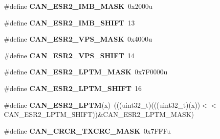 \begin{DoxyCompactItemize}
\item 
\#define {\bfseries C\+A\+N\+\_\+\+E\+S\+R2\+\_\+\+I\+M\+B\+\_\+\+M\+A\+SK}~0x2000u\hypertarget{group__CAN__Register__Masks_ga8e8d269c3e59c20582dd8d0c5ea07daf}{}\label{group__CAN__Register__Masks_ga8e8d269c3e59c20582dd8d0c5ea07daf}

\item 
\#define {\bfseries C\+A\+N\+\_\+\+E\+S\+R2\+\_\+\+I\+M\+B\+\_\+\+S\+H\+I\+FT}~13\hypertarget{group__CAN__Register__Masks_gac5b6c49733501a621096ab8226acafd0}{}\label{group__CAN__Register__Masks_gac5b6c49733501a621096ab8226acafd0}

\item 
\#define {\bfseries C\+A\+N\+\_\+\+E\+S\+R2\+\_\+\+V\+P\+S\+\_\+\+M\+A\+SK}~0x4000u\hypertarget{group__CAN__Register__Masks_ga5fc376e62f61a97583edf7a54b8753be}{}\label{group__CAN__Register__Masks_ga5fc376e62f61a97583edf7a54b8753be}

\item 
\#define {\bfseries C\+A\+N\+\_\+\+E\+S\+R2\+\_\+\+V\+P\+S\+\_\+\+S\+H\+I\+FT}~14\hypertarget{group__CAN__Register__Masks_ga7c22b4e9fdd8beae74e86b256db23665}{}\label{group__CAN__Register__Masks_ga7c22b4e9fdd8beae74e86b256db23665}

\item 
\#define {\bfseries C\+A\+N\+\_\+\+E\+S\+R2\+\_\+\+L\+P\+T\+M\+\_\+\+M\+A\+SK}~0x7\+F0000u\hypertarget{group__CAN__Register__Masks_ga864e9e1cd2a2b0e354b284bd5488f29e}{}\label{group__CAN__Register__Masks_ga864e9e1cd2a2b0e354b284bd5488f29e}

\item 
\#define {\bfseries C\+A\+N\+\_\+\+E\+S\+R2\+\_\+\+L\+P\+T\+M\+\_\+\+S\+H\+I\+FT}~16\hypertarget{group__CAN__Register__Masks_gace1651295c821917bb5b37915baa3771}{}\label{group__CAN__Register__Masks_gace1651295c821917bb5b37915baa3771}

\item 
\#define {\bfseries C\+A\+N\+\_\+\+E\+S\+R2\+\_\+\+L\+P\+TM}(x)~(((uint32\+\_\+t)(((uint32\+\_\+t)(x))$<$$<$C\+A\+N\+\_\+\+E\+S\+R2\+\_\+\+L\+P\+T\+M\+\_\+\+S\+H\+I\+FT))\&C\+A\+N\+\_\+\+E\+S\+R2\+\_\+\+L\+P\+T\+M\+\_\+\+M\+A\+SK)\hypertarget{group__CAN__Register__Masks_ga4462429a39fcbba8b4db218d8a928e88}{}\label{group__CAN__Register__Masks_ga4462429a39fcbba8b4db218d8a928e88}

\item 
\#define {\bfseries C\+A\+N\+\_\+\+C\+R\+C\+R\+\_\+\+T\+X\+C\+R\+C\+\_\+\+M\+A\+SK}~0x7\+F\+F\+Fu\hypertarget{group__CAN__Register__Masks_ga84c305cf0ec60d0624b454e280c69c4b}{}\label{group__CAN__Register__Masks_ga84c305cf0ec60d0624b454e280c69c4b}


\end{DoxyCompactItemize}
